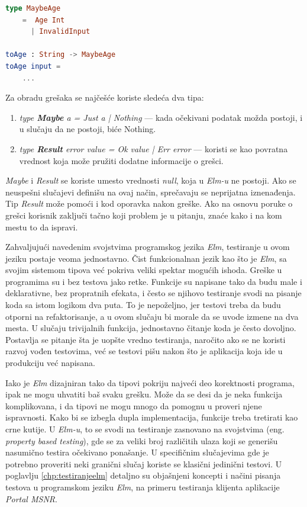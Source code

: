 \documentclass[12pt,oneside]{memoir}
\begin{document}
\begin{lstlisting}[language=elm, caption={Primer definicije i upotrebe korisnički definisanog tipa},captionpos=b, label={lst:errhandle}]
type MaybeAge
	=  Age Int
	  | InvalidInput
	  
toAge : String -> MaybeAge
toAge input = 
	... 
\end{lstlisting}

\par Za obradu grešaka se najčešće koriste sledeća dva tipa: 

\begin{enumerate}
\item \emph{type \textbf{Maybe} a = Just a | Nothing} --- kada očekivani podatak možda postoji, i u slučaju da ne postoji, biće Nothing.
\item \emph{type \textbf{Result} error value = Ok value | Err error} --- koristi se kao povratna vrednost koja može pružiti dodatne informacije o grešci.
\end{enumerate}

\par \emph{Maybe} i \emph{Result} se koriste umesto vrednosti \emph{null}, koja u \emph{Elm-u} ne postoji. Ako se neuspešni slučajevi definišu na ovaj način, sprečavaju se neprijatna iznenađenja. Tip \emph{Result} može pomoći i kod oporavka nakon greške. Ako na osnovu poruke o grešci korisnik zaključi tačno koji problem je u pitanju, znaće kako i na kom mestu to da ispravi. 
\par Zahvaljujući navedenim svojstvima programskog jezika \emph{Elm}, testiranje u ovom jeziku postaje veoma jednostavno. Čist funkcionalnan jezik kao što je \emph{Elm}, sa svojim sistemom tipova već pokriva veliki spektar mogućih ishoda. Greške u programima su i bez testova jako retke. Funkcije su napisane tako da budu male i deklarativne, bez propratnih efekata, i često se njihovo testiranje svodi na pisanje koda sa istom logikom dva puta. To je nepoželjno, jer testovi treba da budu otporni na refaktorisanje, a u ovom slučaju bi morale da se uvode izmene na dva mesta. U slučaju trivijalnih funkcija, jednostavno čitanje koda je često dovoljno. Postavlja se pitanje šta je uopšte vredno testiranja, naročito ako se ne koristi razvoj vođen testovima, već se testovi pišu nakon što je aplikacija koja ide u produkciju već napisana.
\par Iako je \emph{Elm} dizajniran tako da tipovi pokriju najveći deo korektnosti programa, ipak ne mogu uhvatiti baš svaku grešku. Može da se desi da je neka funkcija komplikovana, i da tipovi ne mogu mnogo da pomognu u proveri njene ispravnosti. Kako bi se izbegla dupla implementacija, funkcije treba tretirati kao crne kutije. U \emph{Elm-u}, to se svodi na testiranje zasnovano na svojstvima (eng. \emph{property based testing}), gde se za veliki broj različitih ulaza koji se generišu nasumično testira očekivano ponašanje. U specifičnim slučajevima gde je potrebno proveriti neki granični slučaj koriste se klasični jedinični testovi. U poglavlju \ref{chp:testiranjeelm} detaljno su objašnjeni koncepti i načini pisanja testova u programskom jeziku \emph{Elm}, na primeru testiranja klijenta aplikacije \emph{Portal MSNR}.
\end{document}
